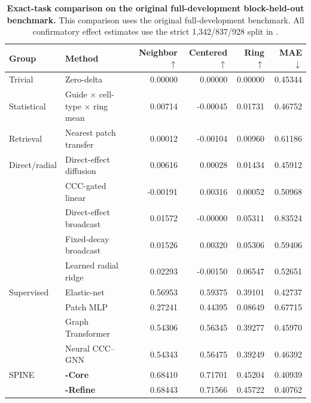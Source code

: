 \begin{table}[t]
\centering
\scriptsize
\caption{\textbf{Exact-task comparison on the original full-development block-held-out benchmark.} This comparison uses the original full-development benchmark. All confirmatory effect estimates use the strict 1,342/837/928 split in .}
\label{tab:exact_task_main}
\setlength{\tabcolsep}{5.2pt}
\begin{tabular}{llrrrr}
\toprule
Group & Method & Neighbor $\uparrow$ & Centered $\uparrow$ & Ring $\uparrow$ & MAE $\downarrow$ \\
\midrule
Trivial & Zero-delta & 0.00000 & 0.00000 & 0.00000 & 0.45344 \\
Statistical & Guide $\times$ cell-type $\times$ ring mean & 0.00714 & -0.00045 & 0.01731 & 0.46752 \\
Retrieval & Nearest patch transfer & 0.00012 & -0.00104 & 0.00960 & 0.61186 \\
Direct/radial & Direct-effect diffusion & 0.00616 & 0.00028 & 0.01434 & 0.45912 \\
 & CCC-gated linear & -0.00191 & 0.00316 & 0.00052 & 0.50968 \\
 & Direct-effect broadcast & 0.01572 & -0.00000 & 0.05311 & 0.83524 \\
 & Fixed-decay broadcast & 0.01526 & 0.00320 & 0.05306 & 0.59406 \\
 & Learned radial ridge & 0.02293 & -0.00150 & 0.06547 & 0.52651 \\
Supervised & Elastic-net & 0.56953 & 0.59375 & 0.39101 & 0.42737 \\
 & Patch MLP & 0.27241 & 0.44395 & 0.08649 & 0.67715 \\
 & Graph Transformer & 0.54306 & 0.56345 & 0.39277 & 0.45970 \\
 & Neural CCC--GNN & 0.54343 & 0.56475 & 0.39249 & 0.46392 \\
SPINE & \textbf{\methodname{}-Core} & 0.68410 & 0.71701 & 0.45204 & 0.40939 \\
 & \textbf{\methodname{}-Refine} & 0.68443 & 0.71566 & 0.45722 & 0.40762 \\
\bottomrule
\end{tabular}
\end{table}
